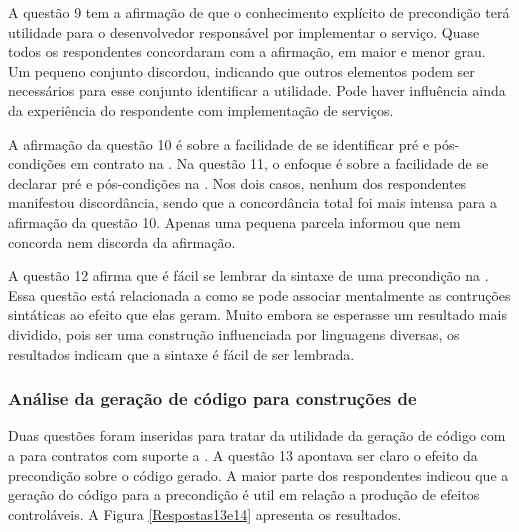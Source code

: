 A questão 9 tem a afirmação de que o conhecimento explícito de precondição terá
utilidade para o desenvolvedor responsável por implementar o serviço. Quase
todos os respondentes concordaram com a afirmação, em maior e menor grau. Um
pequeno conjunto discordou, indicando que outros elementos podem ser
necessários para esse conjunto identificar a utilidade. Pode haver influência
ainda da experiência do respondente com implementação de serviços.

A afirmação da questão 10 é sobre a facilidade de se identificar pré e
pós-condições em contrato na \neoidl{}. Na questão 11, o enfoque é sobre a
facilidade de se declarar pré e pós-condições na \neoidl{}. Nos dois casos,
nenhum dos respondentes manifestou discordância, sendo que a concordância total foi mais
intensa para a afirmação da questão 10. Apenas uma pequena parcela informou que
nem concorda nem discorda da afirmação.

A questão 12 afirma que é fácil se lembrar da sintaxe de uma precondição na
\neoidl{}. Essa questão está relacionada a como se pode associar mentalmente as
contruções sintáticas ao efeito que elas geram. Muito embora se esperasse um
resultado mais dividido, pois ser uma construção influenciada por linguagens
diversas, os resultados indicam que a sintaxe é fácil de ser lembrada.

\subsubsection{Análise da geração de código para construções de \designbycontract{}}

Duas questões foram inseridas para tratar da utilidade da geração de código com
a \neoidl{} para contratos com suporte a \designbycontract{}. A questão 13
apontava ser claro o efeito da precondição sobre o código gerado. A maior parte
dos respondentes indicou que a geração do código para a precondição é util
em relação a produção de efeitos controláveis. A Figura \ref{Respostas13e14}
apresenta os resultados.

